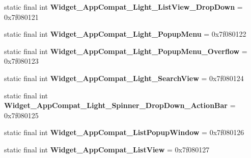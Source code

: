 \begin{DoxyCompactItemize}
\item 
\hypertarget{classandroid_1_1support_1_1v7_1_1appcompat_1_1_r_1_1style_a9bab891cd272faea9b47904984f006d3}{}static final int {\bfseries Widget\+\_\+\+App\+Compat\+\_\+\+Light\+\_\+\+List\+View\+\_\+\+Drop\+Down} = 0x7f080121\label{classandroid_1_1support_1_1v7_1_1appcompat_1_1_r_1_1style_a9bab891cd272faea9b47904984f006d3}

\item 
\hypertarget{classandroid_1_1support_1_1v7_1_1appcompat_1_1_r_1_1style_a7a5a45143d9d2b8450d944430e6da1dc}{}static final int {\bfseries Widget\+\_\+\+App\+Compat\+\_\+\+Light\+\_\+\+Popup\+Menu} = 0x7f080122\label{classandroid_1_1support_1_1v7_1_1appcompat_1_1_r_1_1style_a7a5a45143d9d2b8450d944430e6da1dc}

\item 
\hypertarget{classandroid_1_1support_1_1v7_1_1appcompat_1_1_r_1_1style_a8fd24e81a530ef4c300f29f6c046d707}{}static final int {\bfseries Widget\+\_\+\+App\+Compat\+\_\+\+Light\+\_\+\+Popup\+Menu\+\_\+\+Overflow} = 0x7f080123\label{classandroid_1_1support_1_1v7_1_1appcompat_1_1_r_1_1style_a8fd24e81a530ef4c300f29f6c046d707}

\item 
\hypertarget{classandroid_1_1support_1_1v7_1_1appcompat_1_1_r_1_1style_a9f6f0009b817cabb1dafecf4b0c724c3}{}static final int {\bfseries Widget\+\_\+\+App\+Compat\+\_\+\+Light\+\_\+\+Search\+View} = 0x7f080124\label{classandroid_1_1support_1_1v7_1_1appcompat_1_1_r_1_1style_a9f6f0009b817cabb1dafecf4b0c724c3}

\item 
\hypertarget{classandroid_1_1support_1_1v7_1_1appcompat_1_1_r_1_1style_a98acdcba1fa055bc28faa0fc74c7076a}{}static final int {\bfseries Widget\+\_\+\+App\+Compat\+\_\+\+Light\+\_\+\+Spinner\+\_\+\+Drop\+Down\+\_\+\+Action\+Bar} = 0x7f080125\label{classandroid_1_1support_1_1v7_1_1appcompat_1_1_r_1_1style_a98acdcba1fa055bc28faa0fc74c7076a}

\item 
\hypertarget{classandroid_1_1support_1_1v7_1_1appcompat_1_1_r_1_1style_ad2af4cc0425e1ade5f5e5468ea0f6097}{}static final int {\bfseries Widget\+\_\+\+App\+Compat\+\_\+\+List\+Popup\+Window} = 0x7f080126\label{classandroid_1_1support_1_1v7_1_1appcompat_1_1_r_1_1style_ad2af4cc0425e1ade5f5e5468ea0f6097}

\item 
\hypertarget{classandroid_1_1support_1_1v7_1_1appcompat_1_1_r_1_1style_a1ceeced9a6c41e73bebf6d3531b7f05a}{}static final int {\bfseries Widget\+\_\+\+App\+Compat\+\_\+\+List\+View} = 0x7f080127\label{classandroid_1_1support_1_1v7_1_1appcompat_1_1_r_1_1style_a1ceeced9a6c41e73bebf6d3531b7f05a}


\end{DoxyCompactItemize}
